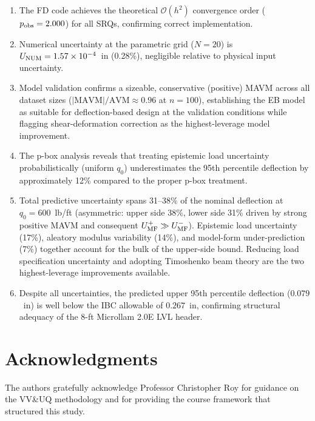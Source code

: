\documentclass[10pt,twocolumn]{article}
\begin{document}
\begin{enumerate}[leftmargin=*, itemsep=2pt]
  \item The FD code achieves the theoretical $\mathcal{O}(h^2)$
    convergence order ($p_{\rm obs}=2.000$) for all SRQs, confirming
    correct implementation.
  \item Numerical uncertainty at the parametric grid ($N=20$) is
    $U_{\rm NUM}=1.57\times10^{-4}$~in (0.28\%), negligible relative
    to physical input uncertainty.
  \item Model validation confirms a sizeable, conservative (positive)
    MAVM across all dataset sizes ($|\mathrm{MAVM}|/\mathrm{AVM}\approx0.96$
    at $n=100$), establishing the EB model as suitable for deflection-based
    design at the validation conditions while flagging shear-deformation
    correction as the highest-leverage model improvement.
  \item The p-box analysis reveals that treating epistemic load uncertainty
    probabilistically (uniform $q_0$) underestimates the 95th percentile
    deflection by approximately 12\% compared to the proper p-box treatment.
  \item Total predictive uncertainty spans 31--38\% of the nominal deflection
    at $q_0=600$~lb/ft (asymmetric: upper side 38\%, lower side 31\%
    driven by strong positive MAVM and consequent $U_{\rm MF}^+\gg U_{\rm MF}^-$).
    Epistemic load uncertainty (17\%), aleatory modulus variability (14\%),
    and model-form under-prediction (7\%) together account for the bulk of
    the upper-side bound.
    Reducing load specification uncertainty and adopting Timoshenko beam
    theory are the two highest-leverage improvements available.
  \item Despite all uncertainties, the predicted upper 95th percentile
    deflection ($0.079$~in) is well below the IBC allowable of $0.267$~in,
    confirming structural adequacy of the 8-ft Microllam 2.0E LVL header.
\end{enumerate}

\section*{Acknowledgments}

The authors gratefully acknowledge Professor Christopher Roy for
guidance on the VV\&UQ methodology and for providing the course
framework that structured this study.

\appendix
\end{document}
